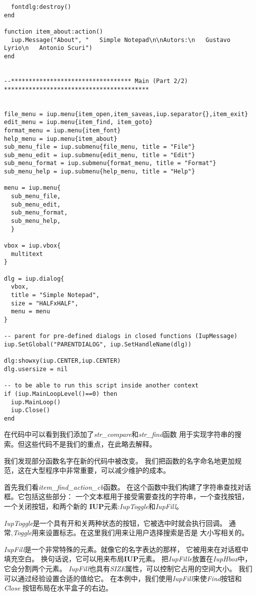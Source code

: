 \documentclass{ctexart}
\begin{document}
\begin{lstlisting}
  fontdlg:destroy()
end

function item_about:action()
  iup.Message("About", "   Simple Notepad\n\nAutors:\n   Gustavo Lyrio\n   Antonio Scuri")
end


--********************************** Main (Part 2/2) *****************************************


file_menu = iup.menu{item_open,item_saveas,iup.separator{},item_exit}
edit_menu = iup.menu{item_find, item_goto}
format_menu = iup.menu{item_font}
help_menu = iup.menu{item_about}
sub_menu_file = iup.submenu{file_menu, title = "File"}
sub_menu_edit = iup.submenu{edit_menu, title = "Edit"}
sub_menu_format = iup.submenu{format_menu, title = "Format"}
sub_menu_help = iup.submenu{help_menu, title = "Help"}

menu = iup.menu{
  sub_menu_file, 
  sub_menu_edit, 
  sub_menu_format, 
  sub_menu_help,
  }

vbox = iup.vbox{
  multitext
}

dlg = iup.dialog{
  vbox,
  title = "Simple Notepad",
  size = "HALFxHALF",
  menu = menu
}

-- parent for pre-defined dialogs in closed functions (IupMessage)
iup.SetGlobal("PARENTDIALOG", iup.SetHandleName(dlg))

dlg:showxy(iup.CENTER,iup.CENTER)
dlg.usersize = nil

-- to be able to run this script inside another context
if (iup.MainLoopLevel()==0) then
  iup.MainLoop()
  iup.Close()
end
\end{lstlisting}

在代码中可以看到我们添加了\emph{str\_compare}和\emph{str\_find}函数
用于实现字符串的搜索。但这些代码不是我们的重点，在此略去解释。

我们发现部分函数名字在新的代码中被改变。
我们把函数的名字命名地更加规范，这在大型程序中非常重要，可以减少维护的成本。

首先我们看\emph{item\_find\_action\_cb}函数。
在这个函数中我们构建了字符串查找对话框。它包括这些部分：
一个文本框用于接受需要查找的字符串，一个查找按钮，一个关闭按钮，和两个新的
\textbf{IUP}元素:\emph{IupToggle}和\emph{IupFill}。

\emph{IupToggle}是一个具有开和关两种状态的按钮，它被选中时就会执行回调。
通常,\emph{Toggle}用来设置标志。在这里我们用来让用户选择搜索是否是
大小写相关的。

\emph{IupFill}是一个非常特殊的元素。就像它的名字表达的那样，
它被用来在对话框中填充空白。
换句话说，它可以用来布局\textbf{IUP}元素。
把\emph{IupFille}放置在\emph{IupHbox}中，它会分割两个元素。
\emph{IupFill}也具有\emph{SIZE}属性，可以控制它占用的空间大小。
我们可以通过经验设置合适的值给它。
在本例中，我们使用\emph{IupFill}来使\emph{Find}按钮和\emph{Close}
按钮布局在水平盒子的右边。
\end{document}
